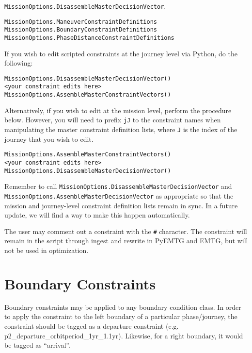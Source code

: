 \documentclass[11pt]{article}
\begin{document}
 \texttt{MissionOptions.DisassembleMasterDecisionVector}.

\begin{verbatim}
MissionOptions.ManeuverConstraintDefinitions
MissionOptions.BoundaryConstraintDefinitions
MissionOptions.PhaseDistanceConstraintDefinitions
\end{verbatim}

If you wish to edit scripted constraints at the journey level via Python, do the following:

\begin{verbatim}
MissionOptions.DisassembleMasterDecisionVector()
<your constraint edits here>
MissionOptions.AssembleMasterConstraintVectors()
\end{verbatim}

Alternatively, if you wish to edit at the mission level, perform the procedure below. However, you will need to prefix \texttt{jJ} to the constraint names when manipulating the master constraint definition lists, where \texttt{J} is the index of the journey that you wish to edit.

\begin{verbatim}
MissionOptions.AssembleMasterConstraintVectors()
<your constraint edits here>
MissionOptions.DisassembleMasterDecisionVector()
\end{verbatim}

Remember to call \texttt{MissionOptions.DisassembleMasterDecisionVector} and \\ \texttt{MissionOptions.AssembleMasterDecisionVector} as appropriate so that the mission and journey-level constraint definition lists remain in sync. In a future update, we will find a way to make this happen automatically.

The user may comment out a constraint with the \texttt{\#} character. The constraint will remain in the script through ingest and rewrite in PyEMTG and EMTG, but will not be used in optimization.

\section{Boundary Constraints}
\label{sec:boundaryConstraints}

Boundary constraints may be applied to any boundary condition class. In order to apply the constraint to the left boundary of a particular phase/journey, the constraint should be tagged as a departure constraint (e.g. p2\_departure\_orbitperiod\_1yr\_1.1yr). Likewise, for a right boundary, it would be tagged as ``arrival''.
\end{document}
